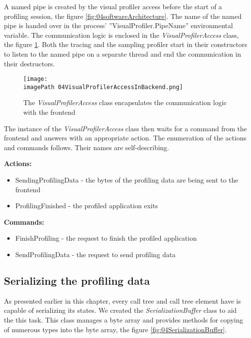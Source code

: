 A named pipe is created by the visual profiler access before the start of a profiling session, the figure \ref{fig:04softwareArchitecture}. The name of the named pipe is handed over in the process' ''VisualProfiler.PipeName'' environmental variable. The communication logic is enclosed in the \textit{VisualProfilerAccess} class, the figure \ref{fig:04VisualProfilerAccessInBackend}. Both the tracing and the sampling profiler start in their constructors to listen to the named pipe on a separate thread and end the communication in their destructors.

\begin{figure}
	\centering
		\texttt{[image: \\imagePath 04VisualProfilerAccessInBackend.png]}
		\caption{The \textit{VisualProfilerAccess} class encapsulates the communication logic with the frontend}
	\label{fig:04VisualProfilerAccessInBackend}
\end{figure}

The instance of the \textit{VisualProfilerAccess} class then waits for a command from the frontend and answers with an appropriate action. The enumeration of the actions and commands follows. Their names are self-describing.

\textbf{Actions:}
\begin{itemize}	
\item	SendingProfilingData - the bytes of the profiling data are being sent to the frontend
\item	ProfilingFinished - the profiled application exits
\end{itemize}

\textbf{Commands:}
\begin{itemize}	
\item	FinishProfiling - the request to finish the profiled application
\item	SendProfilingData - the request to send profiling data
\end{itemize}

\subsection{Serializing the profiling data}
As presented earlier in this chapter, every call tree and call tree element have is capable of serializing its states. We created the \textit{SerializationBuffer} class to aid the this task. This class manages a byte array and provides methods for copying of numerous types into the byte array, the figure \ref{fig:04SerializationBuffer}.

